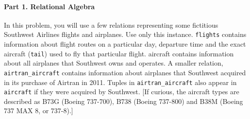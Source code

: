 \documentclass{report}
\renewcommand{\tt}[1]{\texttt{{#1}}}
\begin{document}
\paragraph{Part 1. Relational Algebra}\mbox{} \vspace{10pt}
In this problem, you will use a few relations representing some fictitious Southwest Airlines 
flights and airplanes. Use only this instance. \tt{flights} contains information about flight 
routes on a particular day, departure time and the exact aircraft (\tt{tail}) used to fly that 
particular flight. aircraft contains information about all airplanes that Southwest owns and 
operates. A smaller relation, \tt{airtran\_aircraft} contains information about airplanes that 
Southwest acquired in its purchase of Airtran in 2011. Tuples in \tt{airtran\_aircraft} also 
appear in \tt{aircraft} if they were acquired by Southwest. [If curious, the aircraft types are 
described as B73G (Boeing 737-700), B738 (Boeing 737-800) and B38M (Boeing 737 MAX 8, or 737-8).]
\end{document}
